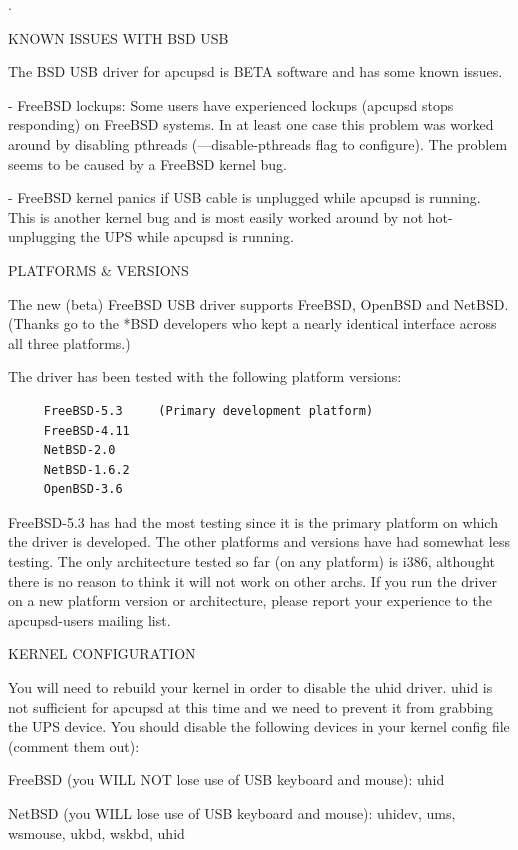 .  

KNOWN ISSUES WITH BSD USB  

The BSD USB driver for apcupsd is BETA software and has some known issues.  

- FreeBSD lockups: Some users have experienced lockups (apcupsd stops 
responding) on FreeBSD systems. In at least one case this problem was worked 
around by disabling pthreads ({---}disable-pthreads flag to configure). The 
problem seems to be caused by a FreeBSD kernel bug.  

- FreeBSD kernel panics if USB cable is unplugged while apcupsd is running. 
This is another kernel bug and is most easily worked around by not hot- 
unplugging the UPS while apcupsd is running.  

PLATFORMS \& VERSIONS  

The new (beta) FreeBSD USB driver supports FreeBSD, OpenBSD and NetBSD.
(Thanks go to the *BSD developers who kept a nearly identical interface across
all three platforms.)  

The driver has been tested with the following platform versions: 

\footnotesize
\begin{verbatim}
     FreeBSD-5.3     (Primary development platform)
     FreeBSD-4.11
     NetBSD-2.0
     NetBSD-1.6.2
     OpenBSD-3.6
\end{verbatim}
\normalsize

FreeBSD-5.3 has had the most testing since it is the primary platform on which
the driver is developed. The other platforms and versions have had somewhat
less testing. The only architecture tested so far (on any platform) is i386,
althought there is no reason to think it will not work on other archs. If you
run the driver on a new platform version or architecture, please report your
experience to the apcupsd-users mailing list.  

KERNEL CONFIGURATION  

You will need to rebuild your kernel in order to disable the uhid driver. uhid
is not sufficient for apcupsd at this time and we need to prevent it from
grabbing the UPS device. You should disable the following devices in your
kernel config file (comment them out):  

FreeBSD (you WILL NOT lose use of USB keyboard and mouse):  uhid  

NetBSD (you WILL lose use of USB keyboard and mouse):  uhidev, ums, wsmouse,
ukbd, wskbd, uhid  

